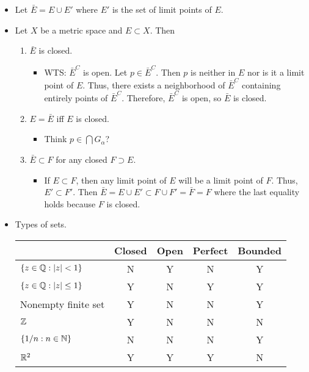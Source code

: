\documentclass[../../notes.tex]{subfiles}
\begin{document}
\begin{itemize}
\begin{itemize}
    \end{itemize}
    \item Let $\bar{E}=E\cup E'$ where $E'$ is the set of limit points of $E$.
    \item Let $X$ be a metric space and $E\subset X$. Then
    \begin{enumerate}
        \item $\bar{E}$ is closed.
        \begin{itemize}
            \item WTS: $\bar{E}^C$ is open. Let $p\in\bar{E}^C$. Then $p$ is neither in $E$ nor is it a limit point of $E$. Thus, there exists a neighborhood of $\bar{E}^C$ containing entirely points of $\bar{E}^C$. Therefore, $\bar{E}^C$ is open, so $\bar{E}$ is closed.
        \end{itemize}
        \item $E=\bar{E}$ iff $E$ is closed.
        \begin{itemize}
            \item Think $p\in\bigcap G_\alpha$?
        \end{itemize}
        \item $\bar{E}\subset F$ for any closed $F\supset E$.
        \begin{itemize}
            \item If $E\subset F$, then any limit point of $E$ will be a limit point of $F$. Thus, $E'\subset F'$. Then $\bar{E}=E\cup E'\subset F\cup F'=\bar{F}=F$ where the last equality holds because $F$ is closed.
        \end{itemize}
    \end{enumerate}
    \item Types of sets.
    \begin{table}[h!]
        \centering
        \small
        \renewcommand{\arraystretch}{1.4}
        \begin{tabular}{l|c|c|c|c}
             & Closed & Open & Perfect & Bounded\\ \hline
            $\{z\in\mathbb{Q}:|z|<1\}$ & N & Y & N & Y\\ \hline
            $\{z\in\mathbb{Q}:|z|\leq 1\}$ & Y & N & Y & Y\\ \hline
            Nonempty finite set & Y & N & N & Y\\ \hline
            $\mathbb{Z}$ & Y & N & N & N\\ \hline
            $\{1/n:n\in\mathbb{N}\}$ & N & N & N & Y\\ \hline
            $\mathbb{R}^2$ & Y & Y & Y & N\\ \hline

\end{tabular}
\end{table}
\end{itemize}
\end{document}
